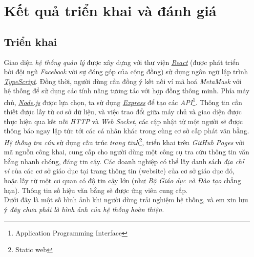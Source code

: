 \newpage
\section{Kết quả triển khai và đánh giá}

\subsection*{Triển khai}

Giao diện \textit{hệ thống quản lý} được xây dựng với thư viện \href{https://reactjs.org}{\textit{React}} (được phát triển bởi đội ngũ \textit{Facebook} với sự đóng góp của cộng đồng) sử dụng ngôn ngữ lập trình \href{https://www.typescriptlang.org/}{\textit{TypeScript}}. Đồng thời, người dùng cần đồng ý kết nối ví mã hoá \textit{MetaMask} với hệ thống để sử dụng các tính năng tương tác với hợp đồng thông minh. Phía máy chủ, \href{https://nodejs.org}{\textit{Node.js}} được lựa chọn, ta sử dụng \href{https://expressjs.com/}{\textit{Express}} để tạo các \textit{API}\footnote{Application Programming Interface}. Thông tin cần thiết được lấy từ cơ sở dữ liệu, và việc trao đổi giữa máy chủ và giao diện được thực hiện qua kết nối \textit{HTTP} và \textit{Web Socket}, các cập nhật từ một người sẽ được thông báo ngay lập tức tới các cá nhân khác trong cùng cơ sở cấp phát văn bằng.\\

\textit{Hệ thống tra cứu} sử dụng cấu trúc \textit{trang tĩnh}\footnote{Static web}, triển khai trên \textit{GitHub Pages} với mã nguồn công khai, cung cấp cho người dùng một công cụ tra cứu thông tin văn bằng nhanh chóng, đáng tin cậy. Các doanh nghiệp có thể lấy danh sách \textit{địa chỉ ví} của các cơ sở giáo dục tại trang thông tin (website) của cơ sở giáo dục đó, hoặc lấy từ một cơ quan có độ tin cậy lớn (như \textit{Bộ Giáo dục và Đào tạo} chẳng hạn). Thông tin số hiệu văn bằng sẽ được ứng viên cung cấp.\\

Dưới đây là một số hình ảnh khi người dùng trải nghiệm hệ thống, và em xin lưu ý \textit{đây chưa phải là hình ảnh của hệ thống hoàn thiện}.\\

